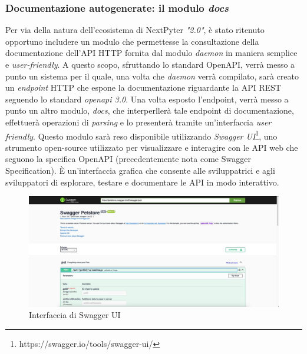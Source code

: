 \subsubsection{Documentazione autogenerate: il modulo \textit{docs}}
Per via della natura dell'ecosistema di NextPyter \textit{"2.0"}, è stato ritenuto opportuno includere un modulo che permettesse la consultazione della documentazione dell'API HTTP fornita dal modulo \textit{daemon} in maniera semplice e \textit{user-friendly}.
\newline
A questo scopo, sfruttando lo standard OpenAPI, verrà messo a punto un sistema per il quale, una volta che \textit{daemon} verrà compilato, sarà creato un \textit{endpoint} HTTP che espone la documentazione riguardante la API REST seguendo lo standard \textit{openapi 3.0}. Una volta esposto l'endpoint, verrà messo a punto un altro modulo, \textit{docs}, che interperllerà tale endpoint di documentazione, effettuerà operazioni di \textit{parsing} e lo presenterà tramite un'interfaccia \textit{user friendly}. Questo modulo sarà reso disponibile utilizzando \textit{Swagger UI}\footnote{https://swagger.io/tools/swagger-ui/}, uno strumento open-source utilizzato per visualizzare e interagire con le API web che seguono la specifica OpenAPI (precedentemente nota come Swagger Specification). È un'interfaccia grafica che consente alle sviluppatrici e agli sviluppatori di esplorare, testare e documentare le API in modo interattivo.
\begin{figure}[h]
    \centering
    \includegraphics[width=1\textwidth]{files/images/swagger-ui.jpg}
    \caption{Interfaccia di Swagger UI}
    \label{fig:swagger-ui}
\end{figure}

